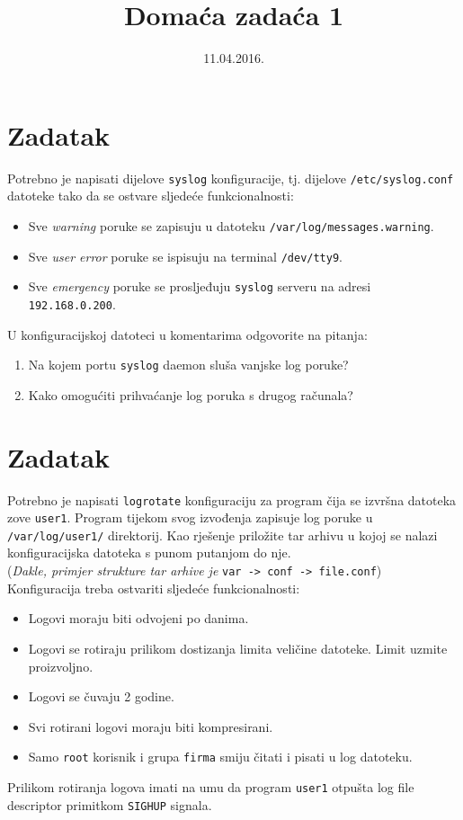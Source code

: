 \documentclass[12pt,a4paper]{article}
\begin{document}
	\title{Domaća zadaća 1}
	\date{\vspace{-5ex} 11.04.2016.}
	\maketitle

	\section{Zadatak}
	Potrebno je napisati dijelove \texttt{syslog} konfiguracije, tj. dijelove \texttt{/etc/syslog.conf} datoteke tako da se ostvare sljedeće funkcionalnosti:
	\begin{itemize}
        \item Sve \textit{warning} poruke se zapisuju u datoteku \texttt{/var/log/messages.warning}.
        \item Sve \textit{user error} poruke se ispisuju na terminal \texttt{/dev/tty9}.
        \item Sve \textit{emergency} poruke se prosljeđuju \texttt{syslog} serveru na adresi \texttt{192.168.0.200}.
    \end{itemize}
    U konfiguracijskoj datoteci u komentarima odgovorite na pitanja:
    \begin{enumerate}
        \item Na kojem portu \texttt{syslog} daemon sluša vanjske log poruke?
        \item Kako omogućiti prihvaćanje log poruka s drugog računala?
    \end{enumerate}

    \section{Zadatak}
    Potrebno je napisati \texttt{logrotate} konfiguraciju za program čija se izvršna datoteka zove \texttt{user1}.
    Program tijekom svog izvođenja zapisuje log poruke u \texttt{/var/log/user1/} direktorij.
    Kao rješenje priložite tar arhivu u kojoj se nalazi konfiguracijska datoteka s punom putanjom do nje.\\
    (\textit{Dakle, primjer strukture tar arhive je} \verb|var -> conf -> file.conf|)\\
    
    \noindent Konfiguracija treba ostvariti sljedeće funkcionalnosti:
    \begin{itemize}
        \item Logovi moraju biti odvojeni po danima.
        \item Logovi se rotiraju prilikom dostizanja limita veličine datoteke. Limit uzmite proizvoljno.
        \item Logovi se čuvaju 2 godine.
        \item Svi rotirani logovi moraju biti kompresirani.
        \item Samo \texttt{root} korisnik i grupa \texttt{firma} smiju čitati i pisati u log datoteku.
    \end{itemize}
    Prilikom rotiranja logova imati na umu da program \texttt{user1} otpušta log file descriptor primitkom \texttt{SIGHUP} signala.
        
\end{document}
